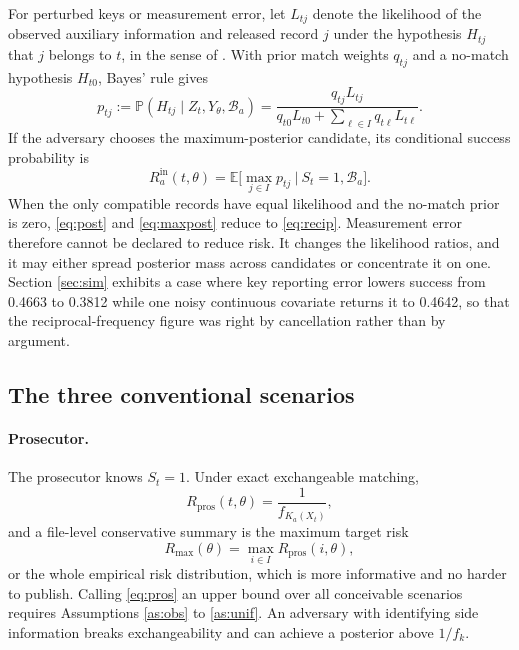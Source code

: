 \documentclass[11pt,a4paper]{article}
\theoremstyle{plain}
\theoremstyle{definition}
\newcommand{\Prob}{\mathbb{P}}
\newcommand{\E}{\mathbb{E}}
\begin{document}
For perturbed keys or measurement error, let $L_{tj}$ denote the likelihood of
the observed auxiliary information and released record $j$ under the hypothesis
$H_{tj}$ that $j$ belongs to $t$, in the sense of \citet{fellegi1969}. With
prior match weights $q_{tj}$ and a no-match hypothesis $H_{t0}$, Bayes' rule
gives
\begin{equation}
p_{tj} := \Prob(H_{tj} \mid Z_t, Y_\theta, \mathcal{B}_a)
= \frac{q_{tj} L_{tj}}{q_{t0} L_{t0} + \sum_{\ell \in I} q_{t\ell} L_{t\ell}} .
\label{eq:post}
\end{equation}
If the adversary chooses the maximum-posterior candidate, its conditional
success probability is
\begin{equation}
R_a^{\mathrm{in}}(t, \theta) = \E\Big[ \max_{j \in I} p_{tj} \ \Big| \ S_t = 1,
\mathcal{B}_a \Big] .
\label{eq:maxpost}
\end{equation}
When the only compatible records have equal likelihood and the no-match prior
is zero, \eqref{eq:post} and \eqref{eq:maxpost} reduce to \eqref{eq:recip}.
Measurement error therefore cannot be declared to reduce risk. It changes the
likelihood ratios, and it may either spread posterior mass across candidates or
concentrate it on one. Section \ref{sec:sim} exhibits a case where key
reporting error lowers success from 0.4663 to 0.3812 while one noisy continuous
covariate returns it to 0.4642, so that the reciprocal-frequency figure was
right by cancellation rather than by argument.

\subsection{The three conventional scenarios}\label{sec:three}

\paragraph{Prosecutor.}
The prosecutor knows $S_t = 1$. Under exact exchangeable matching,
\begin{equation}
R_{\mathrm{pros}}(t, \theta) = \frac{1}{f_{K_a(X_t)}} ,
\label{eq:pros}
\end{equation}
and a file-level conservative summary is the maximum target risk
\begin{equation}
R_{\max}(\theta) = \max_{i \in I} R_{\mathrm{pros}}(i, \theta) ,
\label{eq:max}
\end{equation}
or the whole empirical risk distribution, which is more informative and no
harder to publish. Calling \eqref{eq:pros} an upper bound over all conceivable
scenarios requires Assumptions \ref{as:obs} to \ref{as:unif}. An adversary with
identifying side information breaks exchangeability and can achieve a posterior
above $1/f_k$.
\end{document}
